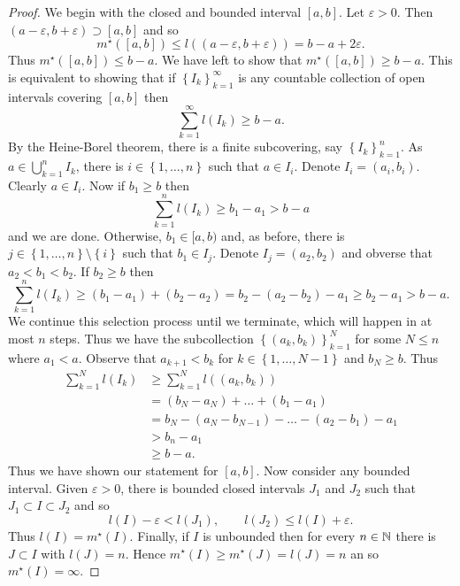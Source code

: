 \begin{proof}
	We begin with the closed and bounded interval $[a,b]$.
	Let $\varepsilon > 0$.
	Then $(a-\varepsilon, b+\varepsilon) \supset [a,b]$
	and so 
	\[
		m^\star([a,b]) \leq l\left( 
			(a - \varepsilon, b + \varepsilon) 
		\right)= b - a + 2\varepsilon.
	\]
	Thus $m^\star([a,b]) \leq b - a$.
	We have left to show that $m^\star([a,b]) \geq b - a$.
	This is equivalent to showing that if $\left\{
		I_k
	\right\}_{k=1}^\infty$ is any countable collection of open intervals
	covering $[a,b]$ then
	\[
		\sum_{k=1}^\infty l(I_k) \geq b - a.
	\]
	By the Heine-Borel theorem, there is a finite subcovering,
	say $\left\{
		I_k
	\right\}_{k=1}^n$.
	As $a \in \bigcup_{k=1}^n I_k$, there is $i \in \left\{
		1,\ldots, n
	\right\}$ such that $a \in I_i$. 
	Denote $I_i = (a_i, b_i)$.
	Clearly $a \in I_i$. Now if $b_1 \geq b$ then
	\[
		\sum_{k=1}^n l(I_k) \geq b_1 - a_1 > b - a
	\]
	and we are done. Otherwise, $b_1 \in [a,b)$ and, as before, there is
	$j \in \left\{
		1, \ldots, n
	\right\} \setminus \left\{
		i
	\right\}$ such that $b_1 \in I_j$.
	Denote $I_j = (a_2, b_2)$ and obverse that $a_2 < b_1 < b_2$.
	If $b_2 \geq b$ then
	\[
		\sum_{k=1}^n l(I_k)
		\geq (b_1 - a_1) + (b_2 - a_2)
		= b_2 - (a_2 - b_2) - a_1
		\geq b_2 - a_1
		> b - a.
	\]
	We continue this selection process until we terminate, which will happen
	in at most $n$ steps.
	Thus we have the subcollection $\left\{
		(a_k, b_k)
	\right\}_{k=1}^N$ for some $N \leq n$ where $a_1 < a$.
	Observe that $a_{k+1} < b_k$ for $k \in \left\{
		1, \ldots, N-1
	\right\}$ and $b_N \geq b$.
	Thus
	\begin{align*}
		\sum^{N}_{k=1} l(I_k)
		&\geq \sum^{N}_{k=1} l\left( 
			(a_k,b_k) 
		\right) \\
		&= (b_N - a_N) + \ldots + (b_1 - a_1) \\
		&= b_N - (a_N - b_{N-1}) - \ldots - (a_2 - b_1) - a_1 \\
		&> b_n - a_1 \\
		&\geq b - a.
	\end{align*}
	Thus we have shown our statement for $[a,b]$.
	Now consider any bounded interval. 
	Given $\varepsilon > 0$, there is bounded closed intervals $J_1$ and $J_2$
	such that $J_1 \subset I \subset J_2$ and so
	\[
		l(I) - \varepsilon < l(J_1), \qquad l(J_2) \leq l(I) + \varepsilon.
	\]
	Thus $l(I) = m^\star(I)$.
	Finally, if $I$ is unbounded then for every $n \in \mathbb{N}$ there is
	$J \subset I$ with $l(J) = n$.
	Hence $m^\star(I) \geq m^\star(J) = l(J) = n$ an so $m^\star(I) = \infty$.
\end{proof}
